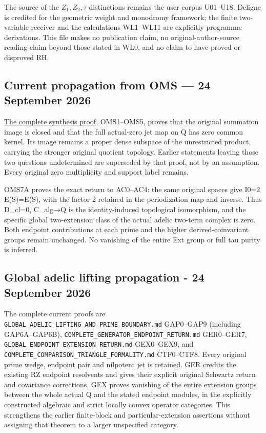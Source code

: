 The source of the \(Z_1,Z_2,\tau\) distinctions remains the user corpus
U01--U18. Deligne is credited for the geometric weight and monodromy
framework; the finite two-variable receiver and the calculations
WL1--WL11 are explicitly programme derivations. This file makes no
publication claim, no original-author-source reading claim beyond those
stated in WL0, and no claim to have proved or disproved RH.

\subsection{Current propagation from OMS --- 24 September
2026}\label{current-propagation-from-oms-24-september-2026-occurrence-4}

\href{ORIGINAL_MELLIN_SPECTRAL_SYNTHESIS.md}{The complete synthesis
proof}, OMS1--OMS5, proves that the original summation image is closed
and that the full actual-zero jet map on Q has zero common kernel. Its
image remains a proper dense subspace of the unrestricted product,
carrying the stronger original quotient topology. Earlier statements
leaving those two questions undetermined are superseded by that proof,
not by an assumption. Every original zero multiplicity and support label
remains.

OMS7A proves the exact return to AC0--AC4: the same original spaces give
I0=2 E(S)=E(S), with the factor 2 retained in the periodization map and
inverse. Thus D\_cl=0, C\_alg→Q is the identity-induced topological
isomorphism, and the specific global two-extension class of the actual
adelic two-term complex is zero. Both endpoint contributions at each
prime and the higher derived-coinvariant groups remain unchanged. No
vanishing of the entire Ext group or full tau purity is inferred.

\subsection{Global adelic lifting propagation - 24 September
2026}\label{global-adelic-lifting-propagation---24-september-2026-occurrence-5}

The complete current proofs are
\nolinkurl{GLOBAL_ADELIC_LIFTING_AND_PRIME_BOUNDARY.md} GAP0--GAP9 (including
GAP6A--GAP6B), \nolinkurl{COMPLETE_GENERATOR_ENDPOINT_RETURN.md} GER0--GER7,
\nolinkurl{GLOBAL_ENDPOINT_EXTENSION_RETURN.md} GEX0--GEX9, and
\nolinkurl{COMPLETE_COMPARISON_TRIANGLE_FORMALITY.md} CTF0--CTF8. Every original
prime wedge, endpoint pair and nilpotent jet is retained. GER credits
the existing RZ endpoint resolvents and gives their explicit original
Schwartz return and covariance corrections. GEX proves vanishing of the
entire extension groups between the whole actual Q and the stated
endpoint modules, in the explicitly constructed algebraic and strict
locally convex operator categories. This strengthens the earlier
finite-block and particular-extension assertions without assigning that
theorem to a larger unspecified category.

